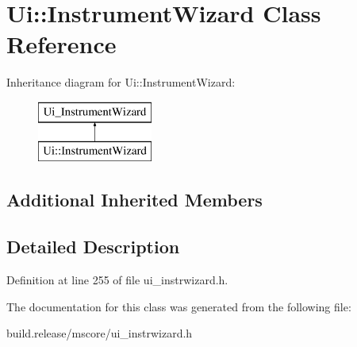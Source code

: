 \hypertarget{class_ui_1_1_instrument_wizard}{}\section{Ui\+:\+:Instrument\+Wizard Class Reference}
\label{class_ui_1_1_instrument_wizard}
Inheritance diagram for Ui\+:\+:Instrument\+Wizard\+:\begin{figure}[H]
\begin{center}
\leavevmode
\includegraphics[height=2.000000cm]{class_ui_1_1_instrument_wizard}
\end{center}
\end{figure}
\subsection*{Additional Inherited Members}


\subsection{Detailed Description}


Definition at line 255 of file ui\+\_\+instrwizard.\+h.



The documentation for this class was generated from the following file\+:\begin{DoxyCompactItemize}
\item 
build.\+release/mscore/ui\+\_\+instrwizard.\+h\end{DoxyCompactItemize}

